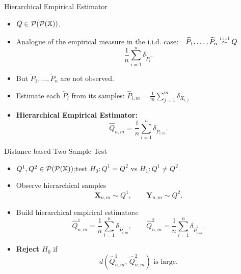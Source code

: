 \documentclass[aspectratio=169, 10pt]{beamer}
\begin{document}

\begin{frame}{Hierarchical Empirical Estimator}
  \begin{itemize}
    \setlength\itemsep{1.1em}
    \item $Q \in \mathcal{P}(\mathcal{P}(\mathbb{X}))$. \pause
    \item Analogue of the empirical measure in the i.i.d. case:$\quad \widetilde{P}_1,\dots, \widetilde{P}_n \overset{\mathrm{i.i.d}}{\sim} Q$
      \[
        \frac{1}{n}\sum_{i=1}^{n} \delta_{\widetilde{P}_i}.
      \]
    
    \item But $\widetilde{P}_1,\ldots,\widetilde{P}_n$ are not observed.
    \pause
    \item Estimate each $\widetilde{P}_i$ from its samples:
    $\widehat{P}_{i,m} = \frac{1}{m}\sum_{j=1}^{m}\delta_{X_{i,j}}$ 
    \pause
    \item \textbf{Hierarchical Empirical Estimator:} 
    \[
        \widehat{Q}_{n,m} = \frac{1}{n}\sum_{i=1}^{n}\delta_{\widehat{P}_{i,m}}.
    \]
  \end{itemize}
\end{frame}

\begin{frame}{Distance based Two Sample Test}
  \begin{itemize}
    \setlength\itemsep{1.1em}
    \item $Q^1, Q^2 \in \mathcal{P}(\mathcal{P}(\mathbb{X}))$;\quad test $H_0: Q^1 = Q^2$ vs $H_1: Q^1 \neq Q^2$.
    \item Observe hierarchical samples
      \[
        \mathbf{X}_{n,m} \sim Q^1, \qquad \mathbf{Y}_{n,m} \sim Q^2.
      \]
    \item Build hierarchical empirical estimators:
      \[
        \widehat{Q}^1_{n,m} = \frac{1}{n}\sum_{i=1}^{n}\delta_{\widehat{P}^1_{i,m}}, \qquad
        \widehat{Q}^2_{n,m} = \frac{1}{n}\sum_{i=1}^{n}\delta_{\widehat{P}^2_{i,m}}.
      \]
    \pause
    \item \textbf{Reject $H_0$} if
      \[
        d\!\left(\widehat{Q}^1_{n,m},\, \widehat{Q}^2_{n,m}\right) \text{ is large}.
      \]
  \end{itemize}
\end{frame}
\end{document}
